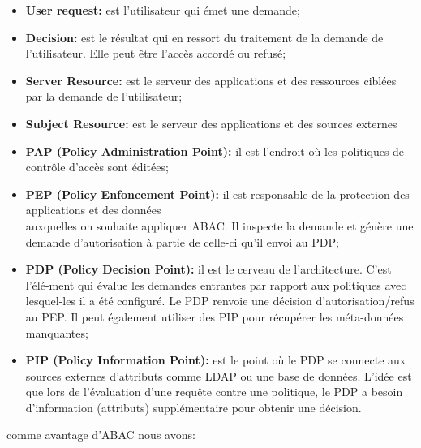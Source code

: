 \begin{itemize}
\item \textbf{User request:} est l'utilisateur qui émet une demande;
\item \textbf{Decision:} est le résultat qui en ressort du traitement de la demande de l'utilisateur. Elle peut être l'accès accordé ou refusé;
\item \textbf{Server Resource:} est le serveur des applications et des ressources ciblées par la demande de l'utilisateur;
\item \textbf{Subject Resource:} est le serveur des applications et des sources externes
\item \textbf{PAP (Policy Administration Point):} il est l'endroit où les politiques de contrôle d'accès sont éditées;
\item \textbf{PEP (Policy Enfoncement Point):} il est responsable de la protection des applications et des données\\ auxquelles on souhaite appliquer ABAC. Il inspecte la demande et génère une demande d'autorisation à partie de celle-ci qu'il envoi au PDP;
\item \textbf{PDP (Policy Decision Point):} il est le cerveau de l'architecture. C'est l'élé-ment qui évalue les demandes entrantes par rapport aux politiques avec lesquel-les il a été configuré. Le PDP renvoie une décision d'autorisation/refus au PEP. Il peut également utiliser des PIP pour récupérer les méta-données manquantes;
\item \textbf{PIP (Policy Information Point):} est le point où le PDP se connecte aux sources externes d'attributs comme LDAP ou une base de données. L'idée est que lors de l'évaluation d'une requête contre une politique, le PDP a besoin d'information (attributs) supplémentaire pour obtenir une décision.
\end{itemize}


\label{sectionAvantagesABAC}

comme avantage d'ABAC nous avons:

